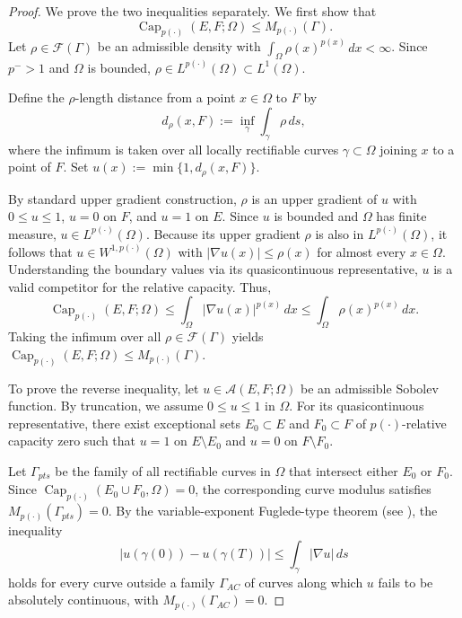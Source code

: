 \documentclass[12pt]{amsart}
\numberwithin{equation}{section}
\theoremstyle{plain}
\theoremstyle{definition}
\begin{document}
\begin{proof}
We prove the two inequalities separately. We first show that
\begin{equation*}
\operatorname{Cap}_{p(\cdot)}(E,F;\Omega) \le M_{p(\cdot)}(\Gamma).
\end{equation*}
Let $\rho \in \mathcal{F}(\Gamma)$ be an admissible density with $\int_\Omega \rho(x)^{p(x)}\,dx < \infty$. Since $p^- > 1$ and $\Omega$ is bounded, $\rho \in L^{p(\cdot)}(\Omega) \subset L^1(\Omega)$.

Define the $\rho$-length distance from a point $x \in \Omega$ to $F$ by
\begin{equation*}
d_\rho(x,F) := \inf_{\gamma} \int_\gamma \rho\,ds,
\end{equation*}
where the infimum is taken over all locally rectifiable curves $\gamma \subset \Omega$ joining $x$ to a point of $F$. Set $u(x) := \min\{1, d_\rho(x,F)\}$.

By standard upper gradient construction, $\rho$ is an upper gradient of $u$ with $0 \le u \le 1$, $u=0$ on $F$, and $u=1$ on $E$. Since $u$ is bounded and $\Omega$ has finite measure, $u \in L^{p(\cdot)}(\Omega)$. Because its upper gradient $\rho$ is also in $L^{p(\cdot)}(\Omega)$, it follows that $u \in W^{1,p(\cdot)}(\Omega)$ with $|\nabla u(x)| \le \rho(x)$ for almost every $x \in \Omega$. Understanding the boundary values via its quasicontinuous representative, $u$ is a valid competitor for the relative capacity. Thus,
\begin{equation*}
\operatorname{Cap}_{p(\cdot)}(E,F;\Omega) \le \int_\Omega |\nabla u(x)|^{p(x)}\,dx \le \int_\Omega \rho(x)^{p(x)}\,dx.
\end{equation*}
Taking the infimum over all $\rho \in \mathcal{F}(\Gamma)$ yields $\operatorname{Cap}_{p(\cdot)}(E,F;\Omega) \le M_{p(\cdot)}(\Gamma)$.

To prove the reverse inequality, let $u \in \mathcal{A}(E,F;\Omega)$ be an admissible Sobolev function. By truncation, we assume $0 \le u \le 1$ in $\Omega$. For its quasicontinuous representative, there exist exceptional sets $E_0 \subset E$ and $F_0 \subset F$ of $p(\cdot)$-relative capacity zero such that $u=1$ on $E \setminus E_0$ and $u=0$ on $F \setminus F_0$.

Let $\Gamma_{pts}$ be the family of all rectifiable curves in $\Omega$ that intersect either $E_0$ or $F_0$. Since $\operatorname{Cap}_{p(\cdot)}(E_0 \cup F_0, \Omega) = 0$, the corresponding curve modulus satisfies $M_{p(\cdot)}(\Gamma_{pts}) = 0$. By the variable-exponent Fuglede-type theorem (see \cite{HHM}), the inequality
\begin{equation}\label{ineq: ACC}
|u(\gamma(0))-u(\gamma(T))| \le \int_\gamma |\nabla u|\,ds
\end{equation}
holds for every curve outside a family $\Gamma _{AC}$ of curves along which $u$ fails to be absolutely continuous, with $M_{p(\cdot)}(\Gamma_{AC}) = 0$.


\end{proof}
\end{document}
